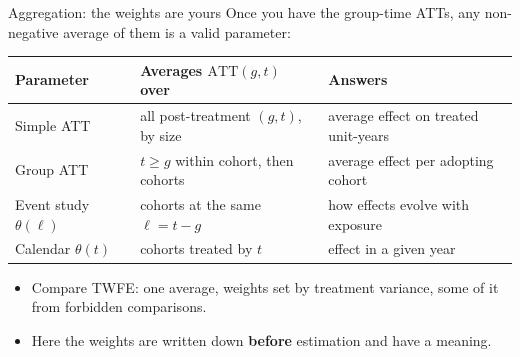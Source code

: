 \documentclass[
  11pt,
  ignorenonframetext,
  aspectratio=169,
]{beamer}
\providecommand{\tightlist}{%
  \setlength{\itemsep}{0pt}\setlength{\parskip}{0pt}}
\begin{document}
\begin{frame}{Aggregation: the weights are yours}
\protect{}\label{aggregation-the-weights-are-yours}
Once you have the group-time ATTs, any non-negative average of them is a
valid parameter:

\begin{center}\small
\begin{tabular}{lll}
\toprule
Parameter & Averages $\text{ATT}(g,t)$ over & Answers \\
\midrule
Simple ATT & all post-treatment $(g,t)$, by size & average effect on treated unit-years \\
Group ATT & $t \ge g$ within cohort, then cohorts & average effect per adopting cohort \\
Event study $\theta(\ell)$ & cohorts at the same $\ell = t - g$ & how effects evolve with exposure \\
Calendar $\theta(t)$ & cohorts treated by $t$ & effect in a given year \\
\bottomrule
\end{tabular}
\end{center}

\begin{itemize}
\tightlist
\item
  Compare TWFE: one average, weights set by treatment variance, some of
  it from forbidden comparisons.
\item
  Here the weights are written down \textbf{before} estimation and have
  a meaning.
\end{itemize}
\end{frame}
\end{document}
